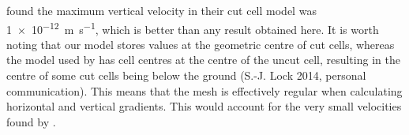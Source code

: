 \citet{good2014} found the maximum vertical velocity in their cut cell model was \SI{1e-12}{\meter\per\second}, which is better than any result obtained here.  It is worth noting that our model stores values at the geometric centre of cut cells, whereas the model used by \citet{good2014} has cell centres at the centre of the uncut cell, resulting in the centre of some cut cells being below the ground (S.-J. Lock 2014, personal communication).  This means that the mesh is effectively regular when calculating horizontal and vertical gradients.  This would account for the very small velocities found by \citet{good2014}.

